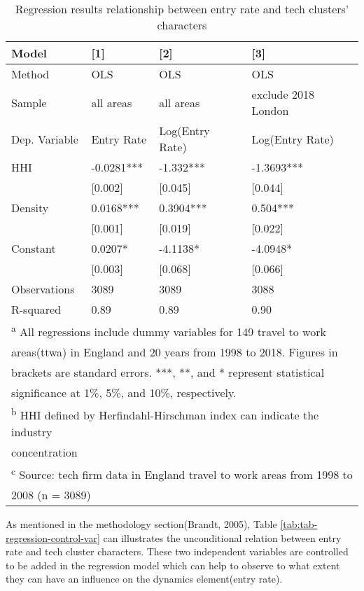 \documentclass[
  12pt,
  oneside]{book}
\begin{document}
\begin{table}

\caption{\label{tab:tab-regression-entry-rate}Regression results relationship between entry rate and tech clusters' characters}
\centering
\begin{tabular}[t]{llll}
\toprule
\textbf{Model} & \textbf{{}[1]} & \textbf{{}[2]} & \textbf{{}[3]}\\
\midrule
Method & OLS & OLS & OLS\\
Sample & all areas & all areas & exclude 2018 London\\
Dep. Variable & Entry Rate & Log(Entry Rate) & Log(Entry Rate)\\
\midrule
HHI & -0.0281*** & -1.332*** & -1.3693***\\
 & {}[0.002] & {}[0.045] & {}[0.044]\\
\addlinespace
Density & 0.0168*** & 0.3904*** & 0.504***\\
 & {}[0.001] & {}[0.019] & {}[0.022]\\
Constant & 0.0207* & -4.1138* & -4.0948*\\
 & {}[0.003] & {}[0.068] & {}[0.066]\\
\midrule
Observations & 3089 & 3089 & 3088\\
\addlinespace
R-squared & 0.89 & 0.89 & 0.90\\
\bottomrule
\multicolumn{4}{l}{\textsuperscript{a} All regressions include dummy variables for 149 travel to work}\\
\multicolumn{4}{l}{areas(ttwa) in England and 20 years from 1998 to 2018. Figures in}\\
\multicolumn{4}{l}{brackets are standard errors. ***, **, and * represent statistical}\\
\multicolumn{4}{l}{significance at 1\%, 5\%, and 10\%, respectively.}\\
\multicolumn{4}{l}{\textsuperscript{b} HHI defined by Herfindahl-Hirschman index can indicate the industry}\\
\multicolumn{4}{l}{concentration}\\
\multicolumn{4}{l}{\textsuperscript{c} Source: tech firm data in England travel to work areas from 1998 to}\\
\multicolumn{4}{l}{2008 (n = 3089)}\\
\end{tabular}
\end{table}

As mentioned in the methodology section(Brandt, 2005), Table \ref{tab:tab-regression-control-var} can illustrates the unconditional relation between entry rate and tech cluster characters. These two independent variables are controlled to be added in the regression model which can help to observe to what extent they can have an influence on the dynamics element(entry rate).
\end{document}
